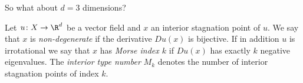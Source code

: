 {
\begin{frame}[plain]
	\begin{center}
    \Large{{So what about $d=3$ dimensions?}}
	\end{center}
\end{frame}
}

\begin{frame}
  \begin{definition}
    Let $u\colon X\to\R^d$ be a vector field and $x$ an interior stagnation point of $u$.
    We say that $x$ is \emph{non-degenerate} if the derivative $Du(x)$ is bijective.
    If in addition $u$ is irrotational we say that $x$ has \emph{Morse index $k$} if $Du(x)$ has exactly $k$ negative eigenvalues.
    The \emph{interior type number} $M_k$ denotes the number of interior stagnation points of index $k$.
  \end{definition}
\end{frame}

